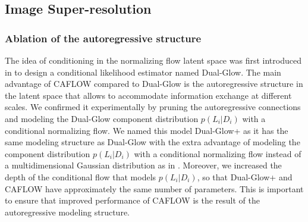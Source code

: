 \subsection{Image Super-resolution}
\subsubsection{Ablation of the autoregressive structure}
The idea of conditioning in the normalizing flow latent space was first introduced in \cite{Dual-Glow} to design a conditional likelihood estimator named Dual-Glow. 
The main advantage of CAFLOW compared to Dual-Glow is the autoregressive structure in the latent space that allows to accommodate information exchange at different scales. We confirmed it experimentally by pruning the autoregressive connections and modeling the Dual-Glow component distribution $p(L_i|D_i)$ with a conditional normalizing flow. We named this model Dual-Glow+ as it has the same modeling structure as Dual-Glow with the extra advantage of modeling the component distribution $p(L_i|D_i)$ with a conditional normalizing flow instead of a multidimensional Gaussian distribution as in  \cite{Dual-Glow}. Moreover, we increased the depth of the conditional flow that models $p(L_i|D_i)$, so that Dual-Glow+ and CAFLOW have approximately the same number of parameters. This is important to ensure that improved performance of CAFLOW is the result of the autoregressive modeling structure.

